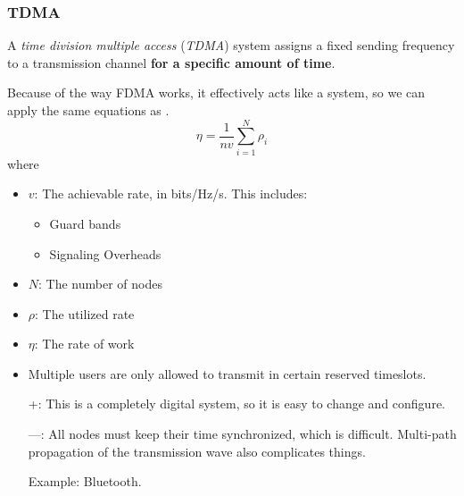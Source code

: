 \subsubsection{TDMA}\label{subsubsec:TDMA}
\begin{definition}\label{def:TDMA}
  A \emph{time division multiple access}  (\emph{TDMA}) system assigns a fixed sending frequency to a transmission channel \textbf{for a specific amount of time}.

  Because of the way FDMA works, it effectively acts like a  system, so we can apply the same equations as .
  \begin{equation}\label{eq:TDMA_Work_Rate}
    \eta = \frac{1}{n v} \sum\limits_{i=1}^{N} \rho_{i}
  \end{equation}
  where
  \begin{itemize}[noitemsep]
  \item $v$: The achievable rate, in bits/Hz/s. This includes:
    \begin{itemize}[noitemsep]
    \item Guard bands
    \item Signaling Overheads
    \end{itemize}
  \item $N$: The number of nodes
  \item $\rho$: The utilized rate
  \item $\eta$: The rate of work
  \end{itemize}

  \begin{itemize}[noitemsep]
  \item Multiple users are only allowed to transmit in certain reserved timeslots.
  \item [+:] This is a completely digital system, so it is easy to change and configure.
  \item [---:] All nodes must keep their time synchronized, which is difficult. Multi-path propagation of the transmission wave also complicates things.
  \item [Example:] Bluetooth.
  \end{itemize}
\end{definition}

